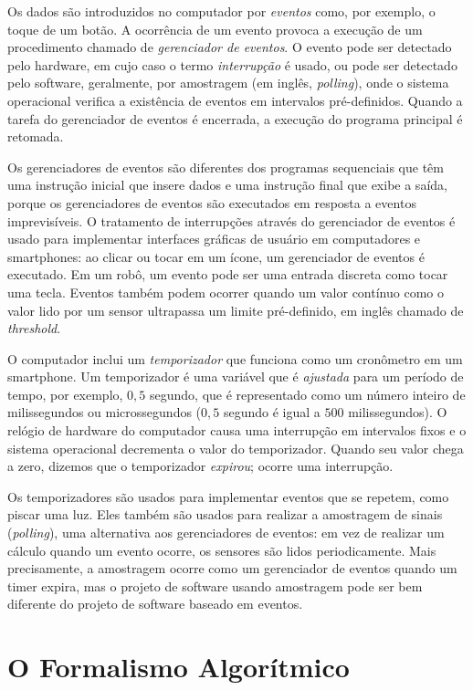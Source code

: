 Os dados são introduzidos no computador por \emph{eventos} como, por exemplo, o toque de um botão. A ocorrência de um evento provoca a execução de um procedimento chamado de \emph{gerenciador de eventos}. O evento pode ser detectado pelo hardware, em cujo caso o termo \emph{interrupção} é usado, ou pode ser detectado pelo software, geralmente, por amostragem (em inglês, \emph{polling}), onde o sistema operacional verifica a existência de eventos em intervalos pré-definidos. Quando a tarefa do gerenciador de eventos é encerrada, a execução do programa principal é retomada.

Os gerenciadores de eventos são diferentes dos programas sequenciais que têm uma instrução inicial que insere dados e uma instrução final que exibe a saída, porque os gerenciadores de eventos são executados em resposta a eventos imprevisíveis. O tratamento de interrupções através do gerenciador de eventos é usado para implementar interfaces gráficas de usuário em computadores e smartphones: ao clicar ou tocar em um ícone, um gerenciador de eventos é executado. Em um robô, um evento pode ser uma entrada discreta como tocar uma tecla. Eventos também podem ocorrer quando um valor contínuo como o valor lido por um sensor ultrapassa um limite pré-definido, em inglês chamado de \emph{threshold}.

O computador inclui um \emph{temporizador} que funciona como um cronômetro em um smartphone. Um temporizador é uma variável que é \emph{ajustada} para um período de tempo, por exemplo, $0,5$ segundo, que é representado como um número inteiro de milissegundos ou microssegundos ($0,5$ segundo é igual a $500$ milissegundos). O relógio de hardware do computador causa uma interrupção em intervalos fixos e o sistema operacional decrementa o valor do temporizador. Quando seu valor chega a zero, dizemos que o temporizador \emph{expirou}; ocorre uma interrupção.

Os temporizadores são usados para implementar eventos que se repetem, como piscar uma luz. Eles também são usados para realizar a amostragem de sinais (\emph{polling}), uma alternativa aos gerenciadores de eventos: em vez de realizar um cálculo quando um evento ocorre, os sensores são lidos periodicamente. Mais precisamente, a amostragem ocorre como um gerenciador de eventos quando um timer expira, mas o projeto de software usando amostragem pode ser bem diferente do projeto de software baseado em eventos.

\section{O Formalismo Algorítmico}\label{s.alg-formalism}

